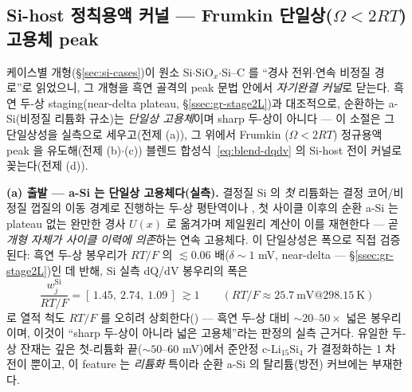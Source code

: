 \subsection{Si-host 정칙용액 커널 --- Frumkin 단일상($\Omega<2RT$) 고용체 peak}\label{ssec:si-frumkin}
케이스별 개형(\S\ref{sec:si-cases})이 원소 Si$\cdot$SiO$_x$$\cdot$Si--C 를 ``경사 전위$\cdot$연속 비정질 경로''로
읽었으니, 그 개형을 흑연 골격의 peak 문법 안에서 \emph{자기완결 커널}로 닫는다. 흑연 두-상 staging(near-delta
plateau, \S\ref{ssec:gr-stage2L})과 대조적으로, 순환하는 a-Si(비정질 리튬화 규소)는 \emph{단일상 고용체}이며
sharp 두-상이 아니다 --- 이 소절은 그 단일상성을 실측으로 세우고(전제 (a)), 그 위에서 Frumkin
($\Omega<2RT$) 정규용액 peak 을 유도해(전제 (b)$\cdot$(c)) 블렌드 합성식~\eqref{eq:blend-dqdv} 의 Si-host
전이 커널로 꽂는다(전제 (d)).

\textbf{(a) 출발 --- a-Si 는 단일상 고용체다(실측).}
결정질 Si 의 \emph{첫} 리튬화는 결정 코어/비정질 껍질의 이동 경계로 진행하는 두-상 평탄역이나
\cite{limthongkul2003}, 첫 사이클 이후의 순환 a-Si 는 plateau 없는 완만한 경사 $U(x)$ 로 옮겨가며 제일원리
계산이 이를 재현한다\cite{chevrier_dahn2009,artrith2018} --- 곧 \emph{개형 자체가 사이클 이력에 의존}하는
연속 고용체다. 이 단일상성은 폭으로 직접 검증된다: 흑연 두-상 봉우리가 $RT/F$ 의 $\lesssim\!0.06$ 배($\delta\!\sim\!1$ mV,
near-delta --- \S\ref{ssec:gr-stage2L})인 데 반해, Si 실측 dQ/dV 봉우리의 폭은
\begin{equation}
\frac{w^\mathrm{Si}_j}{RT/F}=[\,1.45,\ 2.74,\ 1.09\,]\ \gtrsim1
\qquad(RT/F\approx25.7\ \mathrm{mV}@298.15\ \mathrm K)
\label{eq:sifr-widthratio}
\end{equation}
로 열적 척도 $RT/F$ 를 오히려 상회한다() --- 흑연 두-상 대비 $\sim20$--$50\times$
넓은 봉우리이며, 이것이 ``sharp 두-상이 아니라 넓은 고용체''라는 판정의 실측 근거다. 유일한 두-상 잔재는
깊은 첫-리튬화 끝($\sim\!50$--$60$ mV)에서 준안정 $\mathrm{c\text{-}Li_{15}Si_4}$ 가 결정화하는 1 차 전이
뿐이고\cite{obrovac_christensen2004}, 이 feature 는 \emph{리튬화} 특이라 순환 a-Si 의 탈리튬(방전) 커브에는
부재한다.


